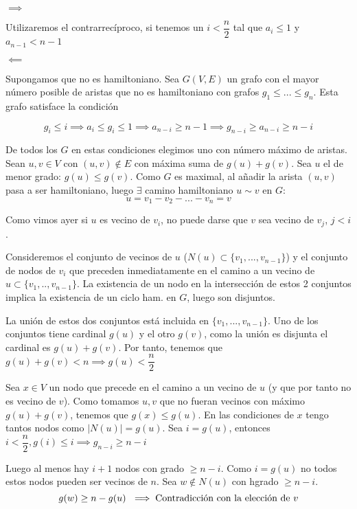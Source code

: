 \documentclass[openany]{book}
\begin{document}
\begin{demonstration}
    
    $ \implies $

    Utilizaremos el contrarrecíproco, si tenemos un $ i < \dfrac{n}{2} $ tal que $ a_i \leq 1 $ y $ a_{n-1} < n-1 $


    $ \impliedby $

    Supongamos que no es hamiltoniano. Sea $ G(V,E) $ un grafo con el mayor número posible de aristas que no es hamiltoniano con grafos $ g_{1}\leq...\leq g_n $. Esta grafo satisface la condición 


    $$ g_i \leq i \implies a_i \leq g_i \leq 1 \implies a_{n-i} \geq n-1 \implies g_{n-i} \geq a_{n-i} \geq n-i $$
    
    De todos los $ G $ en estas condiciones elegimos uno con número máximo de aristas. Sean $ u,v \in V $ con $ (u,v) \not \in E $ con máxima suma de $ g(u)+g(v) $. Sea $ u $ el de menor grado: $ g(u) \leq g(v) $. Como $ G $ es maximal, al añadir la arista $ (u,v) $ pasa a ser hamiltoniano, luego $ \exists $ camino hamiltoniano $ u \sim v $ en $ G $:
    $$ u = v_1-v_2-...-v_n = v $$
    
    Como vimos ayer si $ u $ es vecino de $ v_{i} $, no puede darse que $ v $ sea vecino de $ v_{j} $, $ j<i $. 

    Consideremos el conjunto de vecinos de $ u $ ($ N(u) \subset \{v_1,...,v_{n-1}\} $) y el conjunto de nodos de $ v_i $ que preceden inmediatamente en el camino a un vecino de $ u\subset \{v_1,..,v_{n-1}\} $. La existencia de un nodo en la intersección de estos 2 conjuntos implica la existencia de un ciclo ham. en $ G $, luego son disjuntos.
    
    La unión de estos dos conjuntos está incluida en $ \{v_1,...,v_{n-1}\} $. Uno de los conjuntos tiene cardinal $ g(u) $ y el otro $ g(v) $, como la unión es disjunta el cardinal es $ g(u) + g(v) $. Por tanto, tenemos que $ g(u)+g(v) < n \implies g(u) < \dfrac{n}{2} $

    Sea $ x \in V $ un nodo que precede en el camino a un vecino de $ u $ (y que por tanto no es vecino de $ v $). Como tomamos $ u,v $ que no fueran vecinos con máximo $ g(u)+g(v) $, tenemos que $ g(x) \leq g(u) $. En las condiciones de $ x $ tengo tantos nodos como $ |N(u)| = g(u) $. Sea $ i = g(u) $, entonces $ i<\dfrac{n}{2}, g(i) \leq i \implies g_{n-i} \geq n-i $

    Luego al menos hay  $ i+1 $ nodos  con grado  $ \geq n-i $. Como $ i = g(u) $ no todos estos nodos pueden ser vecinos de $ n $. Sea $ w \not \in N(u) $ con hgrado $ \geq n-i $.
    $$ g(w) \geq n-g(u)\ \implies \text{Contradicción con la elección de $ v $} $$


\end{demonstration}
\end{document}
